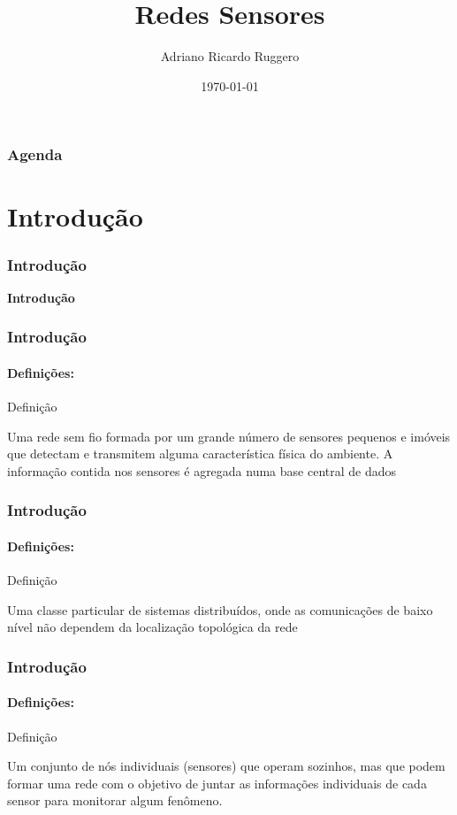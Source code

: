 \documentclass[notes]{beamer}
\title{Redes Sensores}
\subtitle{}
\author{Adriano Ricardo Ruggero}
\institute{Instituto de Computação - Unicamp}
\date{\today}
\begin{document}
\begin{frame}
\label{slide_1}
  \titlepage

\end{frame}

\begin{frame}
\label{slide_2}
  \frametitle{Agenda}
  \tableofcontents
\end{frame}

\section{Introdução}
\begin{frame}
\label{slide_3}
\frametitle{Introdução}

\begin{block}

 \center \textbf{Introdução}
 
\end{block}

\end{frame}

\begin{frame}
\label{slide_4}
\frametitle{Introdução}
\framesubtitle{Definições:} 

\begin{block}{Definição}

Uma rede sem fio formada por um grande número de sensores pequenos e imóveis  que detectam e transmitem alguma característica física do ambiente. A informação contida nos sensores é agregada numa base central de dados \cite{Malladi_1}

\end{block}

\end{frame}

\begin{frame}
\label{slide_5}
\frametitle{Introdução}
\framesubtitle{Definições:} 

\begin{block}{Definição}

Uma classe particular de sistemas distribuídos, onde as comunicações de baixo
nível não dependem da localização topológica da rede \cite{Huang_2}

\end{block}

\end{frame}

\begin{frame}
\label{slide_6}
\frametitle{Introdução}
\framesubtitle{Definições:} 

\begin{block}{Definição}

Um conjunto de nós individuais (sensores) que operam sozinhos, mas que podem formar uma rede com o objetivo de juntar as informações individuais de cada sensor para monitorar algum fenômeno.

\end{block}

\end{frame}
\end{document}
